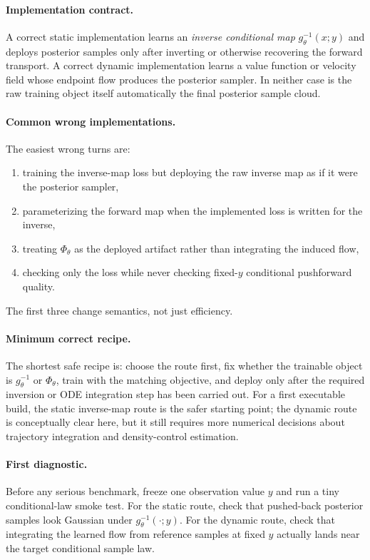 \documentclass[11pt]{report}
\begin{document}
\paragraph{Implementation contract.}
A correct static implementation learns an \emph{inverse conditional map}
$g_\theta^{-1}(x;y)$ and deploys posterior samples only after inverting or otherwise
recovering the forward transport.  A correct dynamic implementation learns a value
function or velocity field whose endpoint flow produces the posterior sampler.  In
neither case is the raw training object itself automatically the final posterior
sample cloud.

\paragraph{Common wrong implementations.}
The easiest wrong turns are:
\begin{enumerate}[label=(\roman*)]
  \item training the inverse-map loss but deploying the raw inverse map as if it were the posterior sampler,
  \item parameterizing the forward map when the implemented loss is written for the inverse,
  \item treating $\Phi_\theta$ as the deployed artifact rather than integrating the induced flow,
  \item checking only the loss while never checking fixed-$y$ conditional pushforward quality.
\end{enumerate}
The first three change semantics, not just efficiency.

\paragraph{Minimum correct recipe.}
The shortest safe recipe is: choose the route first, fix whether the trainable object
is $g_\theta^{-1}$ or $\Phi_\theta$, train with the matching objective, and deploy
only after the required inversion or ODE integration step has been carried out.  For a
first executable build, the static inverse-map route is the safer starting point;
the dynamic route is conceptually clear here, but it still requires more numerical
decisions about trajectory integration and density-control estimation.

\paragraph{First diagnostic.}
Before any serious benchmark, freeze one observation value $y$ and run a tiny
conditional-law smoke test.  For the static route, check that pushed-back posterior
samples look Gaussian under $g_\theta^{-1}(\cdot;y)$.  For the dynamic route, check
that integrating the learned flow from reference samples at fixed $y$ actually lands
near the target conditional sample law.
\end{document}
